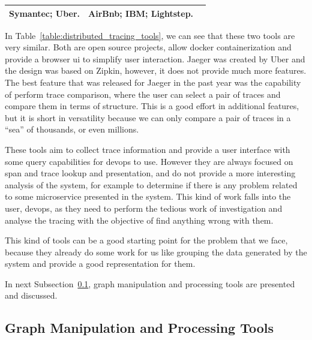 \begin{table}[]
\begin{tabularx}{\linewidth} {
            >{\hsize=0.70\hsize}X|
            >{\hsize=1.15\hsize}X|
            >{\hsize=1.15\hsize}X|}
        Symantec; \newline
        Uber. \newline
         & AirBnb; \newline
        IBM; \newline
        Lightstep.                                                                                                                                                                                                      \\ \hline
    \end{tabularx}
\end{table}

In Table~\ref{table:distributed_tracing_tools}, we can see that these two tools are very similar. Both are open source projects, allow docker containerization and provide a browser ui to simplify user interaction. Jaeger was created by Uber and the design was based on Zipkin, however, it does not provide much more features. The best feature that was released for Jaeger in the past year was the capability of perform trace comparison, where the user can select a pair of traces and compare them in terms of structure. This is a good effort in additional features, but it is short in versatility because we can only compare a pair of traces in a ``sea'' of thousands, or even millions.

These tools aim to collect trace information and provide a user interface with some query capabilities for \gls{devops} to use. However they are always focused on span and trace lookup and presentation, and do not provide a more interesting analysis of the system, for example to determine if there is any problem related to some microservice presented in the system. This kind of work falls into the user, \gls{devops}, as they need to perform the tedious work of investigation and analyse the tracing with the objective of find anything wrong with them.

This kind of tools can be a good starting point for the problem that we face, because they already do some work for us like grouping the data generated by the system and provide a good representation for them.

In next Subsection~\ref{subsec:graph_manipulation_and_processing_tools}, graph manipulation and processing tools are presented and discussed.

\subsection{Graph Manipulation and Processing Tools}
\label{subsec:graph_manipulation_and_processing_tools}

